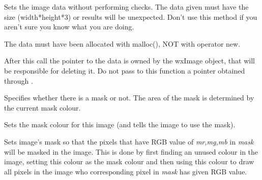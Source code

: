 

\label{wximagesetdata}


Sets the image data without performing checks. The data given must have
the size (width*height*3) or results will be unexpected. Don't use this
method if you aren't sure you know what you are doing.

The data must have been allocated with malloc(), NOT with operator new.

After this call the pointer to the data is owned by the wxImage object,
that will be responsible for deleting it.
Do not pass to this function a pointer obtained through
.

\label{wximagesetmask}


Specifies whether there is a mask or not. The area of the mask is determined by the current mask colour.

\label{wximagesetmaskcolour}


Sets the mask colour for this image (and tells the image to use the mask).

\label{wximagesetmaskfromimage}





Sets image's mask so that the pixels that have RGB value of {\it mr,mg,mb}
in {\it mask} will be masked in the image. This is done by first finding an
unused colour in the image, setting this colour as the mask colour and then
using this colour to draw all pixels in the image who corresponding pixel 
in {\it mask} has given RGB value.

